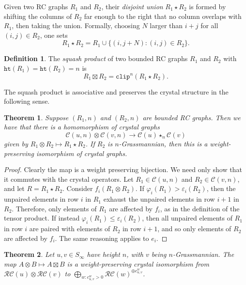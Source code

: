 \documentclass{amsart}
\newtheorem{theorem}{Theorem}[section]
\theoremstyle{definition}
\newtheorem{definition}[lemma]{Definition}
\theoremstyle{remark}
\numberwithin{equation}{section}
\newcommand{\RC}{\mathcal{RC}}
\newcommand{\hr}{\mathtt{ht}}
\begin{document}
Given two RC graphs $R_1$ and $R_2$, their \textit{disjoint union} $R_1 \star R_2$ is formed by shifting the columns of $R_2$ far enough to the right that no column overlaps with $R_1$, then taking the union.  Formally, choosing $N$ larger than $i + j$ for all $(i, j) \in R_2$, one sets
\[
R_1 \star R_2 = R_1 \cup \{(i, j + N) : (i, j) \in R_2\}.
\]

\begin{definition}\label{definition:squash}
The \textit{squash product} of two bounded RC graphs $R_1$ and $R_2$ with $\hr(R_1) = \hr(R_2) = n$ is
\[
R_1 \boxtimes R_2 = \mathtt{clip}^n(R_1 \star R_2).
\]
\end{definition}

The squash product is associative and preserves the crystal structure in the following sense.

\begin{theorem} \label{theorem:starproductcrystal}
  Suppose $(R_1,n)$ and $(R_2,n)$ are bounded RC graphs. Then we have that there is a homomorphism of crystal graphs
  $$\mathscr{C}(u,n)\otimes\mathscr{C}(v,n)\to \mathscr{C}(u) \star_n \mathscr{C}(v) $$
   given by $R_1\otimes R_2 \mapsto R_1\star R_2$. If $R_2$ is $n$-Grassmannian, then this is a weight-preserving isomorphism of crystal graphs.
\end{theorem}
\begin{proof}
Clearly the map is a weight preserving bijection. We need only show that it commutes with the crystal operators. Let $R_1\in \mathscr{C}(u,n)$ and $R_2\in \mathscr{C}(v,n)$, and let $R=R_1\star R_2$. Consider $f_i(R_1\otimes R_2)$. If $\varphi_i(R_1)>\varepsilon_i(R_2)$, then the unpaired elements in row $i$ in $R_1$ exhaust the unpaired elements in row $i+1$ in $R_2$. Therefore, only elements of $R_1$ are affected by $f_i$, as in the definition of the tensor product. If instead $\varphi_i(R_1)\leq \varepsilon_i(R_2)$, then all unpaired elements of $R_1$ in row $i$ are paired with elements of $R_2$ in row $i+1$, and so only elements of $R_2$ are affected by $f_i$. The same reasoning applies to $e_i$.
\end{proof}


\begin{theorem}\label{theorem:squash-crystal}
Let $u, v \in S_\infty$ have height $n$, with $v$ being $n$-Grassmannian.  The map $A \otimes B \mapsto A \boxtimes B$ is a weight-preserving crystal isomorphism from $\RC(u) \otimes \RC(v)$ to $\bigoplus_{w : c_{u,v}^w > 0} \RC(w)^{\oplus c_{u,v}^w}$.
\end{theorem}
\end{document}
